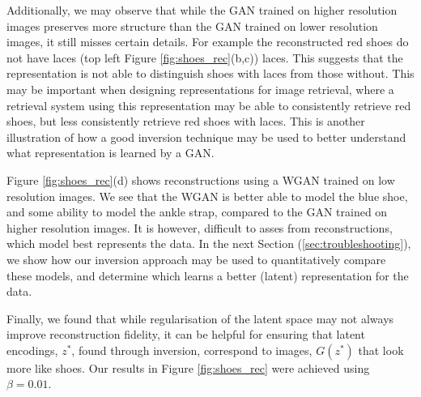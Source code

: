 \documentclass[journal]{IEEEtran}
\begin{document}
Additionally, we may observe that while the GAN trained on higher resolution images preserves more structure than the GAN trained on lower resolution images, it still misses certain details. For example the reconstructed red shoes do not have laces (top left Figure \ref{fig:shoes_rec}(b,c)) laces. This suggests that the representation is not able to distinguish shoes with laces from those without. This may be important when designing representations for image retrieval, where a retrieval system using this representation may be able to consistently retrieve red shoes, but less consistently retrieve red shoes with laces. This is another illustration of how a good inversion technique may be used to better understand what representation is learned by a GAN.

Figure \ref{fig:shoes_rec}(d) shows reconstructions using a WGAN trained on low resolution images. We see that the WGAN is better able to model the blue shoe, and some ability to model the ankle strap, compared to the GAN trained on higher resolution images. It is however, difficult to asses from reconstructions, which model best represents the data. In the next Section (\ref{sec:troubleshooting}), we show how our inversion approach may be used to quantitatively compare these models, and determine which learns a better (latent) representation for the data.

Finally, we found that while regularisation of the latent space may not always improve reconstruction fidelity, it can be helpful for ensuring that latent encodings, $z^*$, found through inversion, correspond to images, $G(z^*)$ that look more like shoes. Our results in Figure \ref{fig:shoes_rec} were achieved using $\beta=0.01$.
\end{document}
